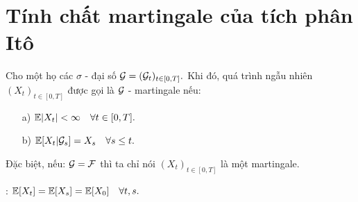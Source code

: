 \section{Tính chất martingale của tích phân Itô}
\begin{defn}
    Cho một họ các $\sigma$ - đại số $\mathcal{G} = (\mathcal{G}_t)_{t \in [0, T]}.$ Khi đó, quá trình ngẫu nhiên $(X_t)_{t \in [0, T]}$ được gọi là $\mathcal{G}$ - martingale nếu: 
    \begin{itemize}
        \item[a)] $\mathbb{E}|X_t| < \infty \quad \forall t \in [0, T].$
        \item[b)] $\mathbb{E}[X_t|\mathcal{G}_s] = X_s \quad \forall s \leq t.$
    \end{itemize}
    Đặc biệt, nếu: $\mathcal{G} = \mathcal{F}$ thì ta chỉ nói $(X_t)_{t\in[0, T]}$ là một martingale.
\end{defn}
\comment: $\mathbb{E}[X_t] = \mathbb{E}[X_s] = \mathbb{E}[X_0] \quad \forall t, s.$\\


